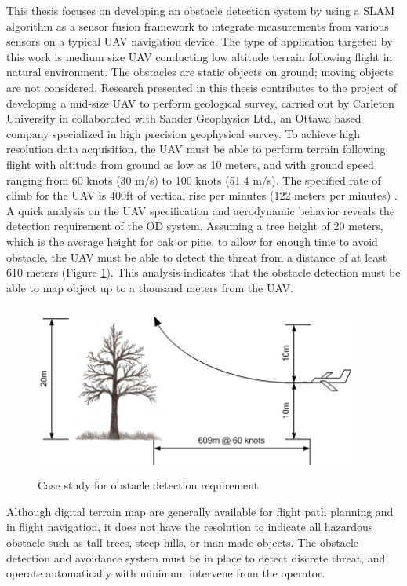 This thesis focuses on developing an obstacle detection system by
using a SLAM algorithm as a sensor fusion framework to integrate
measurements from various sensors on a typical UAV navigation device.
The type of application targeted by this work is medium size UAV
conducting low altitude terrain following flight in natural
environment. The obstacles are static objects on ground; moving
objects are not considered. Research presented in this thesis
contributes to the project of developing a mid-size UAV to perform
geological survey, carried out by Carleton University in collaborated
with Sander Geophysics Ltd., an Ottawa based company specialized in
high precision geophysical survey. To achieve high resolution data
acquisition, the UAV must be able to perform terrain following flight
with altitude from ground as low as 10 meters, and with ground speed
ranging from 60 knots (30 m/s) to 100 knots (51.4 m/s). The specified
rate of climb for the UAV is 400ft of vertical rise per minutes (122
meters per minutes) \cite{james_geosurv_2008}. A quick analysis on the
UAV specification and aerodynamic behavior reveals the detection
requirement of the OD system. Assuming a tree height of 20 meters,
which is the average height for oak or pine, to allow for enough time
to avoid obstacle, the UAV must be able to detect the threat from a
distance of at least 610 meters (Figure \ref{ob}). This analysis
indicates that the obstacle detection must be able to map object up to
a thousand meters from the UAV.

\begin{figure}[h]
\centering
\includegraphics[width=300pt,height=160pt]{./Figures/ProblemStatement.png}
\caption {Case study for obstacle detection requirement}
\label{ob}
\end{figure}

Although digital terrain map are generally available for flight path 
planning and in flight navigation, it does not have the resolution to 
indicate all hazardous obstacle such as tall trees, steep hills, or 
man-made objects. The obstacle detection and avoidance system must 
be in place to detect discrete threat, and operate automatically with 
minimum intervene from the operator. 

